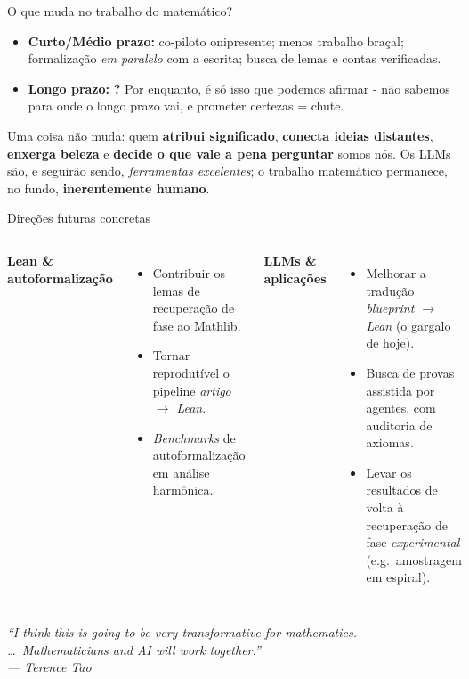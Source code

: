 \documentclass[10pt,aspectratio=169]{beamer}
\newcommand{\hl}[1]{{\color{accent}\textbf{#1}}}
\newcommand{\hlb}[1]{{\color{accent2}\textbf{#1}}}
\newcommand{\hlp}[1]{{\color{accent4}\textbf{#1}}}
\begin{document}
\begin{frame}{O que muda no trabalho do matemático?}
  \begin{itemize}\setlength{\itemsep}{0.55em}
    \item \hl{Curto/Médio prazo:} co-piloto onipresente;
          menos trabalho braçal; formalização \emph{em paralelo} com
          a escrita; busca de lemas e contas verificadas.
    \item \hlb{Longo prazo:} {\bf ?} \pause Por enquanto, é só isso que podemos afirmar - não sabemos para
          onde o longo prazo vai, e prometer certezas = chute.
  \end{itemize}
  \vspace{0.5em}
  \pause
  \begin{quotebox}
    \small\color{fgmain}
    Uma coisa não muda: quem \hlp{atribui significado},
    \hlp{conecta ideias distantes}, \hlp{enxerga beleza} e
    \hlp{decide o que vale a pena perguntar} somos nós. Os LLMs são, e
    seguirão sendo, \emph{ferramentas excelentes}; o trabalho
    matemático permanece, no fundo, \hl{inerentemente humano}.
  \end{quotebox}
\end{frame}

\begin{frame}{Direções futuras concretas}
  \begin{columns}[T,onlytextwidth]
    \textbf{\color{accent}Lean \& autoformalização}
    \begin{itemize}\small
      \item Contribuir os lemas de recuperação de fase ao Mathlib.
      \item Tornar reprodutível o pipeline \emph{artigo $\to$ Lean}.
      \item \emph{Benchmarks} de autoformalização em análise
            harmônica.
    \end{itemize}
    \pause

    \textbf{\color{accent2}LLMs \& aplicações}
    \begin{itemize}\small
      \item Melhorar a tradução \emph{blueprint $\to$ Lean} (o gargalo
            de hoje).
      \item Busca de provas assistida por agentes, com auditoria de
            axiomas.
      \item Levar os resultados de volta à recuperação de fase
            \emph{experimental} (e.g.\ amostragem em espiral).
    \end{itemize}
  \end{columns}
  \vspace{0.8em}
  \pause
  \begin{quotebox}
    \small\itshape\color{fgmain}
    ``I think this is going to be very transformative for mathematics.
    \ldots\ Mathematicians and AI will work together.''\\[0.3em]
    \hfill --- \textnormal{Terence Tao}
  \end{quotebox}
\end{frame}
\end{document}
